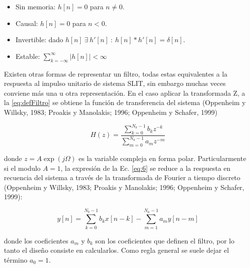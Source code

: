     \begin{itemize}
      \item Sin memoria: $h[n]=0$ para $n \neq 0$.
      \item Causal: $h[n]=0$ para $n<0$.
      \item Invertible: dado $h[n]\: \exists \:h'[n]\::\:h[n]*h'[n]=\delta[n]$.
      \item Estable: $\sum_{k=-\infty}^{\infty}{|h[n]|<\infty}$
    \end{itemize}

    Existen otras formas de representar un filtro, todas estas equivalentes a la respuesta al impulso unitario de sistema SLIT, sin embargo muchas veces conviene más una u otra representación. En el caso aplicar la transformada Z, a la \ref{eq:defFiltro} se obtiene la función de transferencia del sistema (Oppenheim y Willsky, 1983; Proakis y Manolakis; 1996; Oppenheim y Schafer, 1999)

    \begin{equation}
      H(z) = \frac{\sum_{k=0}^{N_b-1}{b_k z^{-k}}}{\sum_{m=0}^{N_a-1}{a_m z^{-m}}}
      \label{eq:6}
    \end{equation}

    donde $z=A\exp(j\Omega)$ es la variable compleja en forma polar. Particularmente si el modulo $A=1$, la expresión de la Ec. \ref{eq:6} se reduce a la respuesta en recuencia del sistema a través de la transformada de Fourier a tiempo discreto (Oppenheim y Willsky, 1983; Proakis y Manolakis; 1996; Oppenheim y Schafer, 1999):

    \begin{equation}
      y[n] = \sum_{k=0}^{N_b-1}{b_k x[n-k]} - \sum_{m=1}^{N_a-1}{a_m y[n-m]}
    \end{equation}

    donde los coeficientes $a_m$ y $b_k$ son los coeficientes que definen el filtro, por lo tanto el diseño consiste en calcularlos. Como regla general se suele dejar el término $a_0=1$.

